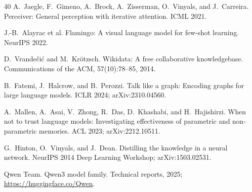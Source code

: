 \documentclass{article}
\begin{document}
\begin{thebibliography}{40}
 A.~Jaegle, F.~Gimeno, A.~Brock, A.~Zisserman, O.~Vinyals, and J.~Carreira.
\newblock Perceiver: General perception with iterative attention.
\newblock ICML 2021.

 J.-B.~Alayrac et al.
\newblock Flamingo: A visual language model for few-shot learning.
\newblock NeurIPS 2022.

 D.~Vrande\v{c}i\'{c} and M.~Kr\"{o}tzsch.
\newblock Wikidata: A free collaborative knowledgebase.
\newblock Communications of the ACM, 57(10):78--85, 2014.

 B.~Fatemi, J.~Halcrow, and B.~Perozzi.
\newblock Talk like a graph: Encoding graphs for large language models.
\newblock ICLR 2024; arXiv:2310.04560.

 A.~Mallen, A.~Asai, V.~Zhong, R.~Das, D.~Khashabi, and H.~Hajishirzi.
\newblock When not to trust language models: Investigating effectiveness of parametric and
  non-parametric memories.
\newblock ACL 2023; arXiv:2212.10511.

 G.~Hinton, O.~Vinyals, and J.~Dean.
\newblock Distilling the knowledge in a neural network.
\newblock NeurIPS 2014 Deep Learning Workshop; arXiv:1503.02531.

 Qwen Team.
\newblock Qwen3 model family.
\newblock Technical reports, 2025; \url{https://huggingface.co/Qwen}.

\end{thebibliography}
\end{document}
